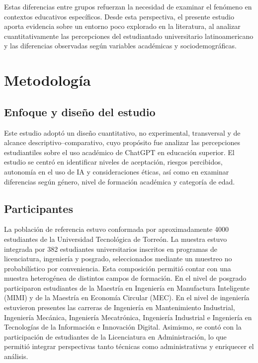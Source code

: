 \documentclass[spanish]{textolivre}
\begin{document}
Estas diferencias entre grupos refuerzan la necesidad de examinar el fenómeno en contextos educativos específicos. Desde esta perspectiva, el presente estudio aporta evidencia sobre un entorno poco explorado en la literatura, al analizar cuantitativamente las percepciones del estudiantado universitario latinoamericano y las diferencias observadas según variables académicas y sociodemográficas.


\section{Metodología}

\subsection{Enfoque y diseño del estudio}
Este estudio adoptó un diseño cuantitativo, no experimental, transversal y de alcance descriptivo–comparativo, cuyo propósito fue analizar las percepciones estudiantiles sobre el uso académico de ChatGPT en educación superior. El estudio se centró en identificar niveles de aceptación, riesgos percibidos, autonomía en el uso de IA y consideraciones éticas, así como en examinar diferencias según género, nivel de formación académica y categoría de edad.


\subsection{Participantes}

La población de referencia estuvo conformada por aproximadamente 4000 estudiantes de la Universidad Tecnológica de Torreón. La muestra estuvo integrada por 382 estudiantes universitarios inscritos en programas de licenciatura, ingeniería y posgrado, seleccionados mediante un muestreo no probabilístico por conveniencia. Esta composición permitió contar con una muestra heterogénea de distintos campos de formación. En el nivel de posgrado participaron estudiantes de la Maestría en Ingeniería en Manufactura Inteligente (MIMI) y de la Maestría en Economía Circular (MEC). En el nivel de ingeniería estuvieron presentes las carreras de Ingeniería en Mantenimiento Industrial, Ingeniería Mecánica, Ingeniería Mecatrónica, Ingeniería Industrial e Ingeniería en Tecnologías de la Información e Innovación Digital. Asimismo, se contó con la participación de estudiantes de la Licenciatura en Administración, lo que permitió integrar perspectivas tanto técnicas como administrativas y enriquecer el análisis.
\end{document}
